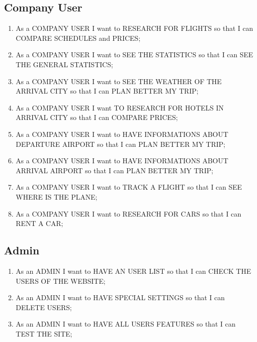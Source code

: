 \documentclass[11pt]{article}
\begin{document}
\subsection{Company User}
\begin{enumerate}
	\item As a COMPANY USER I want to RESEARCH FOR FLIGHTS so that I can COMPARE SCHEDULES and PRICES;
	\item As a COMPANY USER I want to SEE THE STATISTICS so that I can SEE THE GENERAL STATISTICS;
	\item As a COMPANY USER I want to SEE THE WEATHER OF THE ARRIVAL CITY so that I can PLAN BETTER MY TRIP;
	\item As a COMPANY USER I want TO RESEARCH FOR HOTELS IN ARRIVAL CITY so that I can COMPARE PRICES;
	\item As a COMPANY USER I want to HAVE INFORMATIONS ABOUT DEPARTURE AIRPORT so that I can PLAN BETTER MY TRIP;
	\item As a COMPANY USER I want to HAVE INFORMATIONS ABOUT ARRIVAL AIRPORT so that I can PLAN BETTER MY TRIP;
	\item As a COMPANY USER I want to TRACK A FLIGHT so that I can SEE WHERE IS THE PLANE;
	\item As a COMPANY USER I want to RESEARCH FOR CARS so that I can RENT A CAR;
\end{enumerate}

\subsection{Admin}
\begin{enumerate}
	\item As an ADMIN I want to HAVE AN USER LIST so that I can CHECK THE USERS OF THE WEBSITE;
	\item As an ADMIN I want to HAVE SPECIAL SETTINGS so that I can DELETE USERS;
	\item As an ADMIN I want to HAVE ALL USERS FEATURES so that I can TEST THE SITE;
\end{enumerate}

\pagebreak
\end{document}
